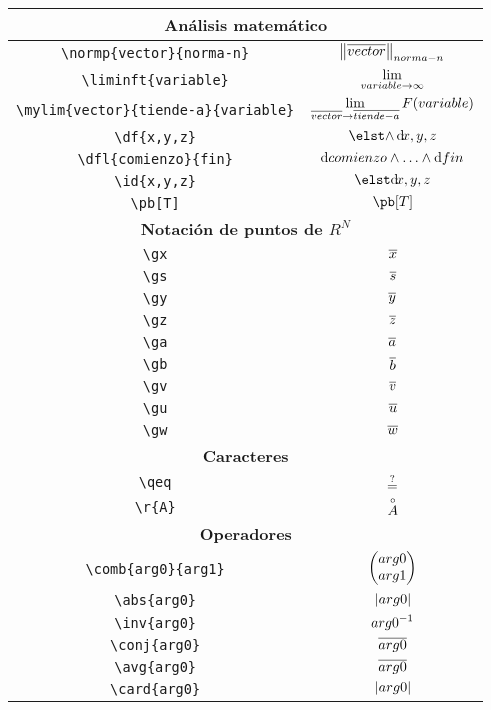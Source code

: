 \begin{longtable}{|c|c|}
\multicolumn{2}{|c|}{\textbf{Análisis matemático}} \\ \hline 
\verb|\normp{vector}{norma-n}| & $\displaystyle\norm{\overline{vector}}_{norma-n}$ \\ \hline 
\verb|\liminft{variable}| & $\displaystyle\lim_{{variable}\rightarrow \infty}$ \\ \hline 
\verb|\mylim{vector}{tiende-a}{variable}| & $\displaystyle\lim_{\overline{vector} \rightarrow \overline{tiende-a}} F({variable})$ \\ \hline 
\verb|\df{x,y,z}| & $\displaystyle\df{x,y,z}$ \\ \hline 
\verb|\dfl{comienzo}{fin}| & $\displaystyle\dfl{comienzo}{fin}$ \\ \hline 
\verb|\id{x,y,z}| & $\displaystyle\id{x,y,z}$ \\ \hline 
\verb|\pb[T]| & $\displaystyle\pb[T]$ \\ \hline 
\multicolumn{2}{|c|}{\textbf{Notación de puntos de $R^N$}} \\ \hline 
\verb|\gx| & $\displaystyle\overline{x}$ \\ \hline 
\verb|\gs| & $\displaystyle\overline{s}$ \\ \hline 
\verb|\gy| & $\displaystyle\overline{y}$ \\ \hline 
\verb|\gz| & $\displaystyle\overline{z}$ \\ \hline 
\verb|\ga| & $\displaystyle\overline{a}$ \\ \hline 
\verb|\gb| & $\displaystyle\overline{b}$ \\ \hline 
\verb|\gv| & $\displaystyle\overline{v}$ \\ \hline 
\verb|\gu| & $\displaystyle\overline{u}$ \\ \hline 
\verb|\gw| & $\displaystyle\overline{w}$ \\ \hline 
\multicolumn{2}{|c|}{\textbf{Caracteres}} \\ \hline 
\verb|\qeq| & $\displaystyle\overset{?}{=}$ \\ \hline 
\verb|\r{A}| & $\displaystyle\overset{\circ}{A}$ \\ \hline 
\multicolumn{2}{|c|}{\textbf{Operadores}} \\ \hline 
\verb|\comb{arg0}{arg1}| & $\displaystyle\left( \begin{matrix} arg0 \\ arg1 \end{matrix} \right)$ \\ \hline 
\verb|\abs{arg0}| & $\displaystyle\left\vert arg0 \right\vert$ \\ \hline 
\verb|\inv{arg0}| & $\displaystyle{arg0}^{-1}$ \\ \hline 
\verb|\conj{arg0}| & $\displaystyle\overline{arg0}$ \\ \hline 
\verb|\avg{arg0}| & $\displaystyle\overline{arg0}$ \\ \hline 
\verb|\card{arg0}| & $\displaystyle\left\vert arg0 \right\vert$ \\ \hline 

\end{longtable}
